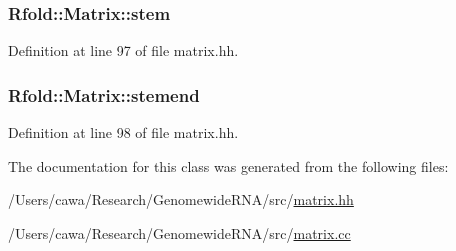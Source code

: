 \hypertarget{class_rfold_1_1_matrix_a20247950e209e5d6d72ef7471c31ec7e}{
\subsubsection[{stem}]{ Rfold\+::\+Matrix\+::stem}}\label{class_rfold_1_1_matrix_a20247950e209e5d6d72ef7471c31ec7e}


Definition at line 97 of file matrix.\+hh.

\hypertarget{class_rfold_1_1_matrix_a64d321f4b4a5447961cd0acc356b2758}{
\subsubsection[{stemend}]{ Rfold\+::\+Matrix\+::stemend}}\label{class_rfold_1_1_matrix_a64d321f4b4a5447961cd0acc356b2758}


Definition at line 98 of file matrix.\+hh.



The documentation for this class was generated from the following files\+:\begin{DoxyCompactItemize}
\item 
/\+Users/cawa/\+Research/\+Genomewide\+R\+N\+A/src/\hyperlink{matrix_8hh}{matrix.\+hh}\item 
/\+Users/cawa/\+Research/\+Genomewide\+R\+N\+A/src/\hyperlink{matrix_8cc}{matrix.\+cc}\end{DoxyCompactItemize}
